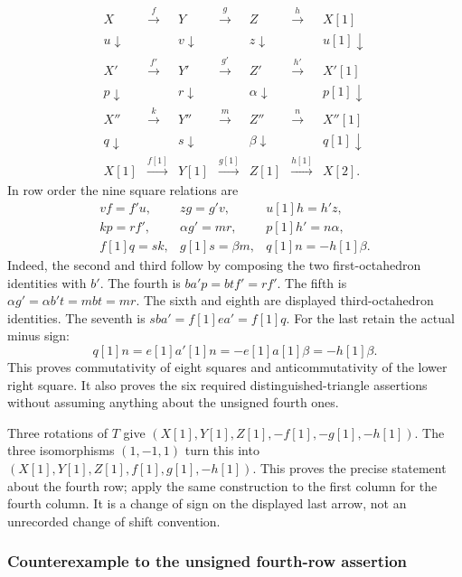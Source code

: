 \documentclass[11pt]{article}
\begin{document}
\[\begin{array}{ccccccc}
X&\xrightarrow f&Y&\xrightarrow g&Z&\xrightarrow h&X[1]\\
{\scriptstyle u}\downarrow&&{\scriptstyle v}\downarrow&&
 {\scriptstyle z}\downarrow&&{\scriptstyle u[1]}\downarrow\\
X'&\xrightarrow{f'}&Y'&\xrightarrow{g'}&Z'&\xrightarrow{h'}&X'[1]\\
{\scriptstyle p}\downarrow&&{\scriptstyle r}\downarrow&&
 {\scriptstyle\alpha}\downarrow&&{\scriptstyle p[1]}\downarrow\\
X''&\xrightarrow k&Y''&\xrightarrow m&Z''&\xrightarrow n&X''[1]\\
{\scriptstyle q}\downarrow&&{\scriptstyle s}\downarrow&&
 {\scriptstyle\beta}\downarrow&&{\scriptstyle q[1]}\downarrow\\
X[1]&\xrightarrow{f[1]}&Y[1]&\xrightarrow{g[1]}&Z[1]&
 \xrightarrow{h[1]}&X[2].
\end{array}
\] In row order the nine square relations are \[
\begin{array}{lll}
vf=f'u,& zg=g'v,&u[1]h=h'z,\\
kp=rf',&\alpha g'=mr,&p[1]h'=n\alpha,\\
f[1]q=sk,&g[1]s=\beta m,&q[1]n=-h[1]\beta.
\end{array}
\] Indeed,\allowbreak{} the second and third follow by composing the two first-octahedron identities with \(b'\). The fourth is \(ba'p=btf'=rf'\). The fifth is \(\alpha g'=\alpha b't=mbt=mr\). The sixth and eighth are displayed third-octahedron identities. The seventh is \(sba'=f[1]ea'=f[1]q\). For the last retain the actual minus sign:\allowbreak{} \[
q[1]n=e[1]a'[1]n=-e[1]a[1]\beta=-h[1]\beta.
\] This proves commutativity of eight squares and anticommutativity of the lower right square. It also proves the six required distinguished-triangle assertions without assuming anything about the unsigned fourth ones.

Three rotations of \(T\) give \((X[1],Y[1],Z[1],-f[1],-g[1],-h[1])\). The three isomorphisms \((1,-1,1)\) turn this into \((X[1],Y[1],Z[1],f[1],g[1],-h[1])\). This proves the precise statement about the fourth row; apply the same construction to the first column for the fourth column. It is a change of sign on the displayed last arrow,\allowbreak{} not an unrecorded change of shift convention.

\subsubsection{Counterexample to the unsigned fourth-row assertion}\label{proofs-0001-1140-counterexample-to-the-unsigned-fourth-row-assertion}
\end{document}

